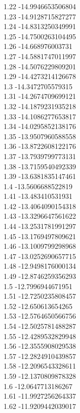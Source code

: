 {1.22	-14.9946653506804\\
1.23	-14.9128715827277\\
1.24	-14.8313250349991\\
1.25	-14.7500263104495\\
1.26	-14.668976003731\\
1.27	-14.5881747011997\\
1.28	-14.5076229809201\\
1.29	-14.4273214126678\\
1.3	-14.3472705579315\\
1.31	-14.2674709699121\\
1.32	-14.1879231935218\\
1.33	-14.1086277653817\\
1.34	-14.0295852138176\\
1.35	-13.9507960588558\\
1.36	-13.8722608122176\\
1.37	-13.7939799773131\\
1.38	-13.7159540492339\\
1.39	-13.6381835147461\\
1.4	-13.5606688522819\\
1.41	-13.483410531931\\
1.42	-13.4064090154318\\
1.43	-13.3296647561622\\
1.44	-13.2531781991297\\
1.45	-13.1769497809621\\
1.46	-13.1009799298968\\
1.47	-13.0252690657715\\
1.48	-12.9498176000134\\
1.49	-12.8746259356293\\
1.5	-12.7996944671951\\
1.51	-12.7250235808457\\
1.52	-12.650613654265\\
1.53	-12.5764650566756\\
1.54	-12.5025781488287\\
1.55	-12.4289532829948\\
1.56	-12.3555908029538\\
1.57	-12.2824910439857\\
1.58	-12.2096543328611\\
1.59	-12.1370809878328\\
1.6	-12.0647713186267\\
1.61	-11.9927256264337\\
1.62	-11.9209442039017\\
}
